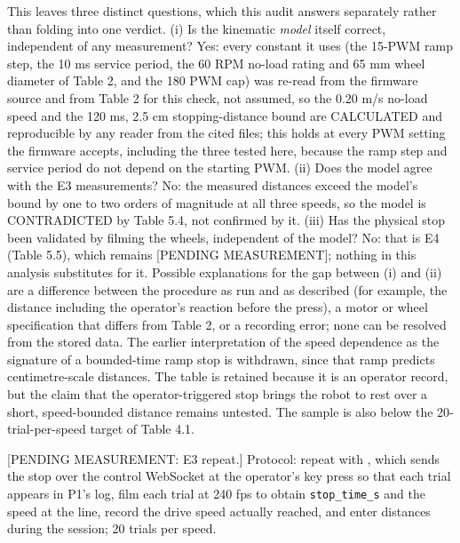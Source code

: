 This leaves three distinct questions, which this audit answers separately rather than folding into one verdict. (i) Is the kinematic \textit{model} itself correct, independent of any measurement? Yes: every constant it uses (the 15-PWM ramp step, the 10 ms service period, the 60 RPM no-load rating and 65 mm wheel diameter of Table 2, and the 180 PWM cap) was re-read from the firmware source and from Table 2 for this check, not assumed, so the 0.20 m/s no-load speed and the 120 ms, 2.5 cm stopping-distance bound are CALCULATED and reproducible by any reader from the cited files; this holds at every PWM setting the firmware accepts, including the three tested here, because the ramp step and service period do not depend on the starting PWM. (ii) Does the model agree with the E3 measurements? No: the measured distances exceed the model's bound by one to two orders of magnitude at all three speeds, so the model is CONTRADICTED by Table 5.4, not confirmed by it. (iii) Has the physical stop been validated by filming the wheels, independent of the model? No: that is E4 (Table 5.5), which remains [PENDING MEASUREMENT]; nothing in this analysis substitutes for it. Possible explanations for the gap between (i) and (ii) are a difference between the procedure as run and as described (for example, the distance including the operator's reaction before the press), a motor or wheel specification that differs from Table 2, or a recording error; none can be resolved from the stored data. The earlier interpretation of the speed dependence as the signature of a bounded-time ramp stop is withdrawn, since that ramp predicts centimetre-scale distances. The table is retained because it is an operator record, but the claim that the operator-triggered stop brings the robot to rest over a short, speed-bounded distance remains untested. The sample is also below the 20-trial-per-speed target of Table 4.1.

[PENDING MEASUREMENT: E3 repeat.] Protocol: repeat with \texttt{}, which sends the stop over the control WebSocket at the operator's key press so that each trial appears in P1's log, film each trial at 240 fps to obtain \texttt{stop\_time\_s} and the speed at the line, record the drive speed actually reached, and enter distances during the session; 20 trials per speed.

